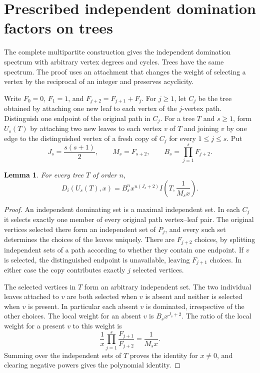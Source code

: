 \documentclass[11pt,a4paper]{article}
\newtheorem{lemma}[theorem]{Lemma}
\begin{document}
\section{Prescribed independent domination factors on trees}
\label{sec:idtree}

The complete multipartite construction gives the independent domination
spectrum with arbitrary vertex degrees and cycles. Trees have the same
spectrum. The proof uses an attachment that changes the weight of selecting
a vertex by the reciprocal of an integer and preserves acyclicity.

Write $F_0=0$, $F_1=1$, and $F_{j+2}=F_{j+1}+F_j$. For $j\ge1$, let
$C_j$ be the tree obtained by attaching one new leaf to each vertex of the
$j$-vertex path. Distinguish one endpoint of the original path in $C_j$.
For a tree $T$ and $s\ge1$, form $U_s(T)$ by attaching two new leaves
to each vertex $v$ of $T$ and joining $v$ by one edge to the distinguished
vertex of a fresh copy of $C_j$ for every $1\le j\le s$. Put
\[
 J_s=\frac{s(s+1)}2,\qquad M_s=F_{s+2},\qquad
 B_s=\prod_{j=1}^s F_{j+2}.
\]

\begin{lemma}\label{lem:idtree-gadget}
For every tree $T$ of order $n$,
\[
 D_i(U_s(T),x)
  = B_s^n x^{n(J_s+2)}
        I\!\left(T,\frac{1}{M_s x}\right).
\]
\end{lemma}
\begin{proof}
An independent dominating set is a maximal independent set. In each $C_j$
it selects exactly one member of every original path vertex--leaf pair.
The original vertices selected there form an independent set of $P_j$,
and every such set determines the choices of the leaves uniquely. There
are $F_{j+2}$ choices, by splitting independent sets of a path according to
whether they contain one endpoint. If $v$ is selected, the distinguished
endpoint is unavailable, leaving $F_{j+1}$ choices. In either case the
copy contributes exactly $j$ selected vertices.

The selected vertices in $T$ form an arbitrary independent set. The two
individual leaves attached to $v$ are both selected when $v$ is absent
and neither is selected when $v$ is present. In particular each absent
$v$ is dominated, irrespective of the other choices. The local weight for
an absent $v$ is $B_s x^{J_s+2}$. The ratio of the local weight for a
present $v$ to this weight is
\[
 \frac{1}{x}\prod_{j=1}^s\frac{F_{j+1}}{F_{j+2}}=
 \frac{1}{M_s x}.
\]
Summing over the independent sets of $T$ proves the identity for $x\ne0$,
and clearing negative powers gives the polynomial identity.
\end{proof}
\end{document}
